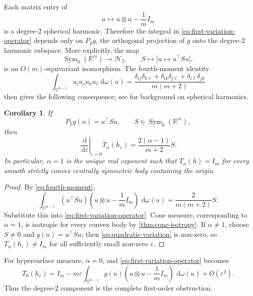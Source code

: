 \documentclass[11pt,a4paper]{amsart}
\numberwithin{equation}{section}
\theoremstyle{plain}
\newtheorem{corollary}[theorem]{Corollary}
\theoremstyle{definition}
\theoremstyle{remark}
\DeclareMathOperator{\Sym}{Sym}
\newcommand{\R}{\mathbb{R}}
\newcommand{\dd}{\,\mathrm{d}}
\newcommand{\Id}{I}
\newcommand{\sphere}{\mathbb{S}}
\begin{document}
Each matrix entry of
\[
u\longmapsto u\otimes u-\frac1m\Id_m
\]
is a degree-$2$ spherical harmonic. Therefore the integral in \eqref{eq:first-variation-operator} depends only on $P_2g$, the orthogonal projection of $g$ onto the degree-$2$ harmonic subspace. More explicitly, the map
\[
\Sym_0(\R^m)\longrightarrow\mathcal H_2,
\qquad
S\longmapsto\big[u\mapsto u^\top Su\big],
\]
is an $O(m)$-equivariant isomorphism. The fourth-moment identity
\begin{equation}\label{eq:fourth-moment}
\int_{\sphere^{m-1}}u_iu_ju_ku_\ell\,\dd\omega(u)
=\frac{\delta_{ij}\delta_{k\ell}+\delta_{ik}\delta_{j\ell}+\delta_{i\ell}\delta_{jk}}{m(m+2)}
\end{equation}
then gives the following consequence; see \cite{DaiXu} for background on spherical harmonics.

\begin{corollary}\label{cor:degree-two}
If
\[
P_2g(u)=u^\top Su,
\qquad S\in\Sym_0(\R^m),
\]
then
\begin{equation}\label{eq:quadratic-variation}
\left.\frac{\dd}{\dd\varepsilon}\right|_{\varepsilon=0}T_\alpha(h_\varepsilon)
=\frac{2(\alpha-1)}{m+2}S.
\end{equation}
In particular, $\alpha=1$ is the unique real exponent such that $T_\alpha(h)=\Id_m$ for every smooth strictly convex centrally symmetric body containing the origin.
\end{corollary}

\begin{proof}
By \eqref{eq:fourth-moment},
\[
\int_{\sphere^{m-1}}(u^\top Su)
\left(u\otimes u-\frac1m\Id_m\right)\,\dd\omega(u)
=\frac{2}{m(m+2)}S.
\]
Substitute this into \eqref{eq:first-variation-operator}. Cone measure, corresponding to $\alpha=1$, is isotropic for every convex body by \cref{thm:cone-isotropy}. If $\alpha\neq1$, choose $S\neq0$ and $g(u)=u^\top Su$; then \eqref{eq:quadratic-variation} is non-zero, so $T_\alpha(h_\varepsilon)\neq\Id_m$ for all sufficiently small non-zero $\varepsilon$.
\end{proof}

For hypersurface measure, $\alpha=0$, and \eqref{eq:first-variation-operator} becomes
\begin{equation}\label{eq:hypersurface-variation}
T_0(h_\varepsilon)
=\Id_m-m\varepsilon\int_{\sphere^{m-1}}g(u)
\left(u\otimes u-\frac1m\Id_m\right)\,\dd\omega(u)
+O(\varepsilon^2).
\end{equation}
Thus the degree-$2$ component is the complete first-order obstruction.
\end{document}
